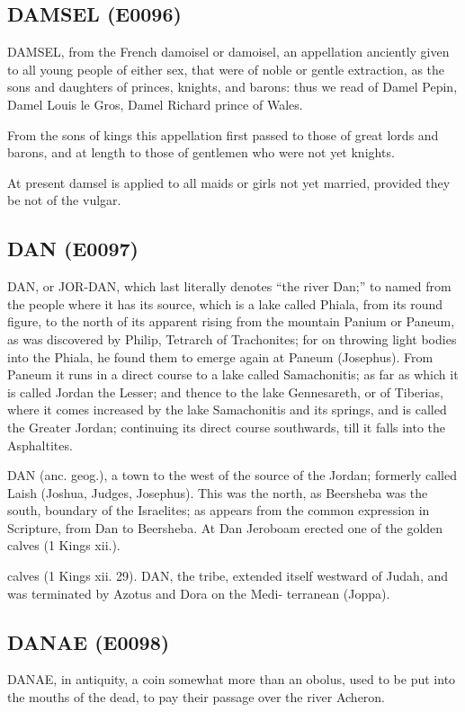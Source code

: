 \documentclass{article}
\begin{document}
\subsection*{DAMSEL (E0096)}
DAMSEL, from the French damoisel or damoisel, an appellation anciently given to all young people of either sex, that were of noble or gentle extraction, as the sons and daughters of princes, knights, and barons: thus we read of Damel Pepin, Damel Louis le Gros, Damel Richard prince of Wales.

From the sons of kings this appellation first passed to those of great lords and barons, and at length to those of gentlemen who were not yet knights.

At present damsel is applied to all maids or girls not yet married, provided they be not of the vulgar.

\subsection*{DAN (E0097)}
DAN, or JOR-DAN, which last literally denotes “the river Dan;” to named from the people where it has its source, which is a lake called Phiala, from its round figure, to the north of its apparent rising from the mountain Panium or Paneum, as was discovered by Philip, Tetrarch of Trachonites; for on throwing light bodies into the Phiala, he found them to emerge again at Paneum (Josephus). From Paneum it runs in a direct course to a lake called Samachonitis; as far as which it is called Jordan the Lesser; and thence to the lake Gennesareth, or of Tiberias, where it comes increased by the lake Samachonitis and its springs, and is called the Greater Jordan; continuing its direct course southwards, till it falls into the Asphaltites.

DAN (anc. geog.), a town to the west of the source of the Jordan; formerly called Laish (Joshua, Judges, Josephus). This was the north, as Beersheba was the south, boundary of the Israelites; as appears from the common expression in Scripture, from Dan to Beersheba. At Dan Jeroboam erected one of the golden calves (1 Kings xii.).

calves (1 Kings xii. 29).
DAN, the tribe, extended itself westward of Judah,
and was terminated by Azotus and Dora on the Medi-
terranean (Joppa).

\subsection*{DANAE (E0098)}
DANAE, in antiquity, a coin somewhat more than an obolus, used to be put into the mouths of the dead, to pay their passage over the river Acheron.
\end{document}
